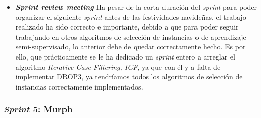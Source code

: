 \begin{itemize}
\item \textbf{\textit{Sprint review meeting}}
Ha pesar de la corta duración del \textit{sprint} para poder organizar el siguiente \textit{sprint} antes de las festividades navideñas, el trabajo realizado ha sido correcto e importante, debido a que para poder seguir trabajando en otros algoritmos de selección de instancias o de aprendizaje semi-supervisado, lo anterior debe de quedar correctamente hecho. Es por ello, que prácticamente se le ha dedicado un \textit{sprint} entero a arreglar el algoritmo \textit{Iterative Case Filtering, ICF}, ya que con él y a falta de implementar DROP3, ya tendríamos todos los algoritmos de selección de instancias correctamente implementados.
\end{itemize}
\vfill
\subsubsection{\textit{Sprint} 5: Murph}
